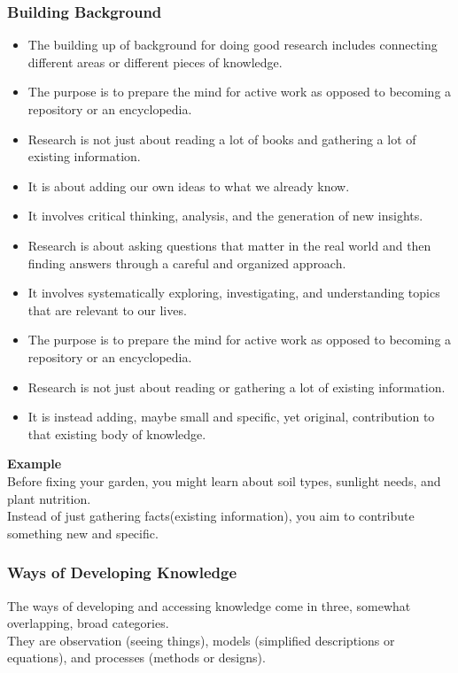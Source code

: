 \documentclass{article}
\begin{document}
	\subsubsection{Building Background}
	\begin{itemize}
		\item The building up of background for doing good research includes connecting different areas or
			different pieces of knowledge.
		\item The purpose is to prepare the mind for active work as opposed to becoming a repository or an
			encyclopedia.
		\item Research is not just about reading a lot of books and gathering a lot of existing information.
		\item It is about adding our own ideas to what we already know.
		\item It involves critical thinking, analysis, and the generation of new insights.
		\item Research is about asking questions that matter in the real world and then finding answers
			through a careful and organized approach.
		\item It involves systematically exploring, investigating, and understanding topics that are relevant
			to our lives.
		\item The purpose is to prepare the mind for active work as opposed to becoming a repository or an
			encyclopedia.
		\item Research is not just about reading or gathering a lot of existing information.
		\item It is instead adding, maybe small and specific, yet original, contribution to that existing body
			of knowledge.
	\end{itemize}

	\noindent \textbf{Example} \\
	Before fixing your garden, you might learn about soil types, sunlight needs, and plant nutrition. \\
	Instead of just gathering facts(existing information), you aim to contribute something new and specific.

	\subsubsection{Ways of Developing Knowledge}
	The ways of developing and accessing knowledge come in three, somewhat overlapping, broad categories. \\
	They are observation (seeing things), models (simplified descriptions or equations), and processes (methods
	or designs).
\end{document}
